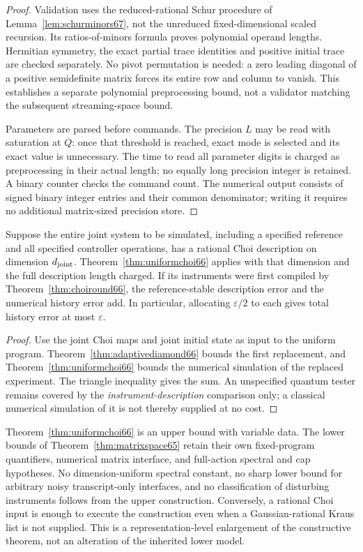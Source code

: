 \begin{proof}
Validation uses the reduced-rational Schur procedure of
Lemma~\ref{lem:schurminors67}, not the unreduced fixed-dimensional
scaled recursion. Its ratios-of-minors formula proves polynomial
operand lengths. Hermitian symmetry, the exact partial trace
identities and positive initial trace are checked separately. No
pivot permutation is needed: a zero leading diagonal of a positive
semidefinite matrix forces its entire row and column to vanish.
This establishes a separate polynomial preprocessing bound, not a
validator matching the subsequent streaming-space bound.

Parameters are parsed before commands. The precision $L$ may be read
with saturation at $Q$: once that threshold is reached, exact mode is
selected and its exact value is unnecessary. The time to read all
parameter digits is charged as preprocessing in their actual length;
no equally long precision integer is retained. A binary counter checks
the command count. The numerical output consists of signed binary
integer entries and their common denominator; writing it requires no
additional matrix-sized precision store.
\end{proof}

\begin{corollary}\label{cor:jointsimulation66}
Suppose the entire joint system to be simulated, including a specified
reference and all specified controller operations, has a rational Choi
description on dimension $d_{\rm joint}$. Theorem~\ref{thm:uniformchoi66}
applies with that dimension and the full description length charged.
If its instruments were first compiled by
Theorem~\ref{thm:choiround66}, the reference-stable description error
and the numerical history error add. In particular, allocating
$\varepsilon/2$ to each gives total history error at most $\varepsilon$.
\end{corollary}
\begin{proof}
Use the joint Choi maps and joint initial state as input to the uniform
program. Theorem~\ref{thm:adaptivediamond66} bounds the first
replacement, and Theorem~\ref{thm:uniformchoi66} bounds the numerical
simulation of the replaced experiment. The triangle inequality gives
the sum. An unspecified quantum tester remains covered by the
\emph{instrument-description} comparison only; a classical numerical
simulation of it is not thereby supplied at no cost.
\end{proof}

Theorem~\ref{thm:uniformchoi66} is an upper bound with variable data.
The lower bounds of Theorem~\ref{thm:matrixspace65} retain their own
fixed-program quantifiers, numerical matrix interface, and full-action
spectral and cap hypotheses. No dimension-uniform spectral constant,
no sharp lower bound for arbitrary noisy transcript-only interfaces,
and no classification of disturbing instruments follows from the
upper construction. Conversely, a rational Choi input is enough to
execute the construction even when a Gaussian-rational Kraus list is
not supplied. This is a representation-level enlargement of the
constructive theorem, not an alteration of the inherited lower model.
